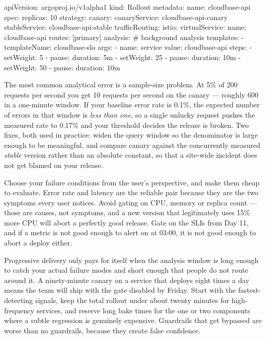 \begin{k8sbox}
apiVersion: argoproj.io/v1alpha1
kind: Rollout
metadata:
  name: cloudbase-api
spec:
  replicas: 10
  strategy:
    canary:
      canaryService: cloudbase-api-canary
      stableService: cloudbase-api-stable
      trafficRouting:
        istio:
          virtualService:
            name: cloudbase-api
            routes: [primary]
      analysis:                        # background analysis
        templates:
          - templateName: cloudbase-slo
        args:
          - name: service
            value: cloudbase-api
      steps:
        - setWeight: 5
        - pause: {duration: 5m}
        - setWeight: 25
        - pause: {duration: 10m}
        - setWeight: 50
        - pause: {duration: 10m}
\end{k8sbox}

\begin{perfnote}
The most common analytical error is a sample-size problem. At 5\% of 200 requests per second you get 10 requests per second on the canary --- roughly 600 in a one-minute window. If your baseline error rate is 0.1\%, the expected number of errors in that window is \emph{less than one}, so a single unlucky request pushes the measured rate to 0.17\% and your threshold decides the release is broken. Two fixes, both used in practice: widen the query window so the denominator is large enough to be meaningful, and compare canary against the concurrently measured \emph{stable} version rather than an absolute constant, so that a site-wide incident does not get blamed on your release.
\end{perfnote}

\begin{reliability}
Choose your failure conditions from the user's perspective, and make them cheap to evaluate. Error rate and latency are the reliable pair because they are the two symptoms every user notices. Avoid gating on CPU, memory or replica count --- those are causes, not symptoms, and a new version that legitimately uses 15\% more CPU will abort a perfectly good release. Gate on the SLIs from Day 11, and if a metric is not good enough to alert on at 03:00, it is not good enough to abort a deploy either.
\end{reliability}

\begin{seniornote}
Progressive delivery only pays for itself when the analysis window is long enough to catch your actual failure modes and short enough that people do not route around it. A ninety-minute canary on a service that deploys eight times a day means the team will ship with the gate disabled by Friday. Start with the fastest-detecting signals, keep the total rollout under about twenty minutes for high-frequency services, and reserve long bake times for the one or two components where a subtle regression is genuinely expensive. Guardrails that get bypassed are worse than no guardrails, because they create false confidence.
\end{seniornote}

